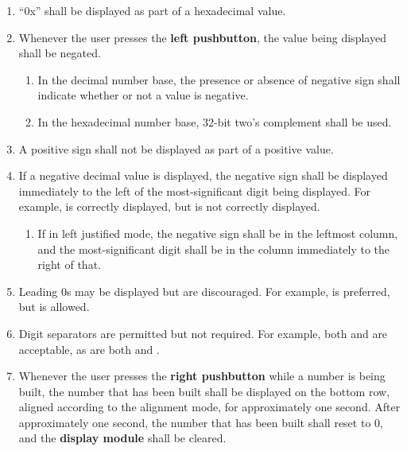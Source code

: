 \begin{enumerate}
\begin{enumerate}
\begin{enumerate}
        \end{enumerate}
    \item ``0x'' shall be displayed as part of a hexadecimal value.
    \item Whenever the user presses the \textbf{left pushbutton}, the value
        being displayed shall be negated.
        \begin{enumerate}
        \item In the decimal number base, the presence or absence of negative
            sign shall indicate whether or not a value is negative.
        \item In the hexadecimal number base, 32-bit two's complement shall be
            used.
        \end{enumerate}
    \item A positive sign shall not be displayed as part of a positive value.
    \item If a negative decimal value is displayed, the negative sign shall
        be displayed immediately to the left of the most-significant digit
        being displayed. For example,  is correctly
        displayed, but  is not correctly displayed.
        \begin{enumerate}
        \item If in left justified mode, the negative sign shall be in the
            leftmost column, and the most-significant digit shall be in the
            column immediately to the right of that.
        \end{enumerate}
    \item Leading 0s may be displayed but are discouraged. For example,
         is preferred, but  is allowed.
    \item Digit separators are permitted but not required. For example, both
         and  are acceptable, as are both
         and .
    \item Whenever the user presses the \textbf{right pushbutton} while a number
        is being built, the number that has been built shall be displayed on the
        bottom row, aligned according to the alignment mode, for approximately
        one second. After approximately one second, the number that has been
        built shall reset to 0, and the \textbf{display module} shall be cleared.

\end{enumerate}
\end{enumerate}
